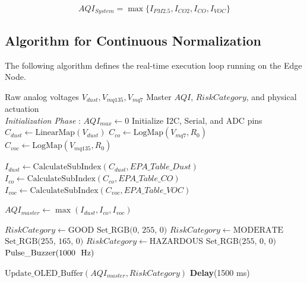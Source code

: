 \documentclass[12pt,journal,onecolumn,a4paper]{IEEEtran}
\begin{document}
\begin{equation}
AQI_{System} = \max \{ I_{PM2.5}, I_{CO2}, I_{CO}, I_{VOC} \}
\end{equation}

\subsection{Algorithm for Continuous Normalization}
The following algorithm defines the real-time execution loop running on the Edge Node.

\begin{algorithm}[htbp]
\caption{Real-Time Multi-Pollutant AQI Calculation and Hardware Actuation}
\begin{algorithmic}[1]
\renewcommand{\algorithmicrequire}{\textbf{Input:}}
\renewcommand{\algorithmicensure}{\textbf{Output:}}
\REQUIRE Raw analog voltages $V_{dust}, V_{mq135}, V_{mq7}$
\ENSURE Master $AQI$, $RiskCategory$, and physical actuation
\\ \textit{Initialization Phase} :
\STATE $AQI_{max} \leftarrow 0$
\STATE Initialize I2C, Serial, and ADC pins
    \STATE $C_{dust} \leftarrow \text{LinearMap}(V_{dust})$
    \STATE $C_{co} \leftarrow \text{LogMap}(V_{mq7}, R_0)$
    \STATE $C_{voc} \leftarrow \text{LogMap}(V_{mq135}, R_0)$
    
    \STATE $I_{dust} \leftarrow \text{CalculateSubIndex}(C_{dust}, EPA\_Table\_Dust)$
    \STATE $I_{co} \leftarrow \text{CalculateSubIndex}(C_{co}, EPA\_Table\_CO)$
    \STATE $I_{voc} \leftarrow \text{CalculateSubIndex}(C_{voc}, EPA\_Table\_VOC)$
    
    \STATE $AQI_{master} \leftarrow \max(I_{dust}, I_{co}, I_{voc})$
    
        \STATE $RiskCategory \leftarrow \text{GOOD}$
        \STATE $\text{Set\_RGB(0, 255, 0)}$ 
        \STATE $RiskCategory \leftarrow \text{MODERATE}$
        \STATE $\text{Set\_RGB(255, 165, 0)}$ 
    \ELSE
        \STATE $RiskCategory \leftarrow \text{HAZARDOUS}$
        \STATE $\text{Set\_RGB(255, 0, 0)}$ 
        \STATE $\text{Pulse\_Buzzer(1000 \text{ Hz})}$
    \ENDIF
    
    \STATE $\text{Update\_OLED\_Buffer}(AQI_{master}, RiskCategory)$
    \STATE \textbf{Delay}(1500 ms) 
\ENDWHILE
\end{algorithmic}
\end{algorithm}
\end{document}
